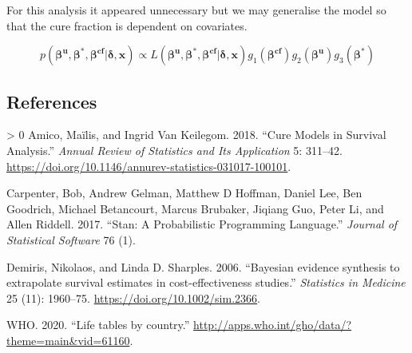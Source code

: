 \documentclass[
]{article}
\newlength{\cslhangindent}
\newenvironment{CSLReferences}[3] %
 {%
  \setlength{\parindent}{0pt}
  \ifodd #1 \everypar{\setlength{\hangindent}{\cslhangindent}}\ignorespaces\fi
  \ifnum #2 > 0
  \setlength{\parskip}{#2\baselineskip}
  \fi
 }%
 {}
\begin{document}
For this analysis it appeared unnecessary but we may generalise the
model so that the cure fraction is dependent on covariates.

\[
p(\boldsymbol{\beta^u},\boldsymbol{\beta^*}, \boldsymbol{\beta^{cf}} | \boldsymbol{\delta}, \boldsymbol{x}) \propto L(\boldsymbol{\beta^u},\boldsymbol{\beta^*}, \boldsymbol{\beta^{cf}} | \boldsymbol{\delta}, \boldsymbol{x}) g_1(\boldsymbol{\beta^{cf}})  g_2(\boldsymbol{\beta^u}) g_3(\boldsymbol{\beta^*})
\]

\hypertarget{references}{%
\subsection*{References}\label{references}}

\hypertarget{refs}{}
\begin{CSLReferences}{1}{0}
\leavevmode\hypertarget{ref-Amico2018}{}%
Amico, Maïlis, and Ingrid Van Keilegom. 2018. {``{Cure Models in
Survival Analysis}.''} \emph{Annual Review of Statistics and Its
Application} 5: 311--42.
\url{https://doi.org/10.1146/annurev-statistics-031017-100101}.

\leavevmode\hypertarget{ref-carpenter2017stan}{}%
Carpenter, Bob, Andrew Gelman, Matthew D Hoffman, Daniel Lee, Ben
Goodrich, Michael Betancourt, Marcus Brubaker, Jiqiang Guo, Peter Li,
and Allen Riddell. 2017. {``Stan: A Probabilistic Programming
Language.''} \emph{Journal of Statistical Software} 76 (1).

\leavevmode\hypertarget{ref-Demiris2006}{}%
Demiris, Nikolaos, and Linda D. Sharples. 2006. {``{Bayesian evidence
synthesis to extrapolate survival estimates in cost-effectiveness
studies}.''} \emph{Statistics in Medicine} 25 (11): 1960--75.
\url{https://doi.org/10.1002/sim.2366}.

\leavevmode\hypertarget{ref-wholifetables}{}%
WHO. 2020. {``{Life tables by country}.''}
\url{http://apps.who.int/gho/data/?theme=main\&vid=61160}.

\end{CSLReferences}
\end{document}
